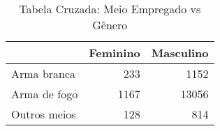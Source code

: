 \begin{table}[ht]
\centering
\begin{tabular}{lrr}
  \hline
 & Feminino & Masculino \\ 
  \hline
Arma branca & 233 & 1152 \\ 
  Arma de fogo & 1167 & 13056 \\ 
  Outros meios & 128 & 814 \\ 
   \hline
\end{tabular}
\caption{Tabela Cruzada: Meio Empregado vs Gênero} 
\end{table}
